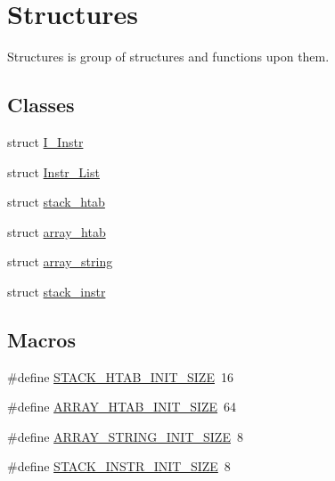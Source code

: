 \hypertarget{group__structures}{}\section{Structures}
\label{group__structures}


Structures is group of structures and functions upon them.  


\subsection*{Classes}
\begin{DoxyCompactItemize}
\item 
struct \hyperlink{structI__Instr}{I\+\_\+\+Instr}
\item 
struct \hyperlink{structInstr__List}{Instr\+\_\+\+List}
\item 
struct \hyperlink{structstack__htab}{stack\+\_\+htab}
\item 
struct \hyperlink{structarray__htab}{array\+\_\+htab}
\item 
struct \hyperlink{structarray__string}{array\+\_\+string}
\item 
struct \hyperlink{structstack__instr}{stack\+\_\+instr}
\end{DoxyCompactItemize}
\subsection*{Macros}
\begin{DoxyCompactItemize}
\item 
\#define \hyperlink{group__structures_gaacafe24c4bd0e04c93bd17e8c669f47a}{S\+T\+A\+C\+K\+\_\+\+H\+T\+A\+B\+\_\+\+I\+N\+I\+T\+\_\+\+S\+I\+Z\+E}~16
\item 
\#define \hyperlink{group__structures_ga883c53765dfed4030e94f8f0d06aa126}{A\+R\+R\+A\+Y\+\_\+\+H\+T\+A\+B\+\_\+\+I\+N\+I\+T\+\_\+\+S\+I\+Z\+E}~64
\item 
\#define \hyperlink{group__structures_ga188b77e9f97cdfd9919e4270f26a5f0f}{A\+R\+R\+A\+Y\+\_\+\+S\+T\+R\+I\+N\+G\+\_\+\+I\+N\+I\+T\+\_\+\+S\+I\+Z\+E}~8
\item 
\#define \hyperlink{group__structures_ga132b2787e64d54f69abb3d2f6efa5378}{S\+T\+A\+C\+K\+\_\+\+I\+N\+S\+T\+R\+\_\+\+I\+N\+I\+T\+\_\+\+S\+I\+Z\+E}~8
\end{DoxyCompactItemize}
